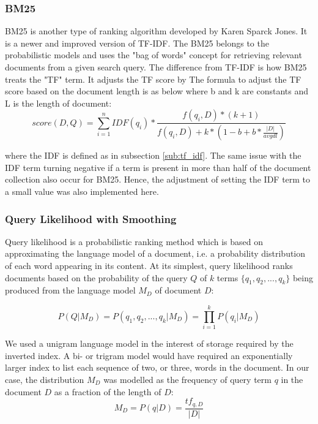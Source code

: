 
\subsubsection{BM25} %
\label{ssub:BM25}

BM25 is another type of ranking algorithm developed by Karen Sparck Jones. It is a newer and improved version of TF-IDF. The BM25 belongs to the probabilistic models and uses the "bag of words" concept for retrieving relevant documents from a given search query. The difference from TF-IDF is how BM25 treats the "TF" term. It adjusts the TF score by The formula to adjust the TF score based on the document length is as below where b and k are constants and L is the length of document:
$$ score(D, Q) = \sum_{i=1}^n IDF(q_i) * \frac{f(q_i, D)* (k + 1)}{f(q_i, D) + k * (1-b + b * \frac{|D|}{avgdl})}$$

where the IDF is defined as in subsection \ref{sub:tf_idf}. The same issue with the IDF term turning negative if a term is present in more than half of the document collection also occur for BM25. Hence, the adjustment of setting the IDF term to a small value was also implemented here.


\subsubsection{Query Likelihood with Smoothing} %
\label{ssub:query_likelihood_with_smoothing}

Query likelihood is a probabilistic ranking method which is based on approximating the language model of a document, i.e. a probability distribution of each word appearing in its content. At its simplest, query likelihood ranks documents based on the probability of the query $Q$ of $k$ terms $\{q_1,q_2,...,q_k\}$ being produced from the language model $M_D$ of document $D$:

\[ P(Q | M_D) = P(q_1,q_2,...,q_k | M_D) = \prod_{i=1}^{k} P(q_i | M_D)\]

We used a unigram language model in the interest of storage required by the inverted index. A bi- or trigram model would have required an exponentially larger index to list each sequence of two, or three, words in the document. In our case, the distribution $M_D$ was modelled as the frequency of query term $q$ in the document $D$ as a fraction of the length of $D$:
\[ M_D = P(q | D) = \frac{tf_{q,D}}{|D|} \]

